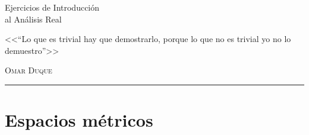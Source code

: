\documentclass[12pt,a4paper]{report}
\begin{document}
\begin{titlepage}
\vspace*{2cm}

\noindent
\vspace*{0.5cm}
\titlefont Ejercicios de Introducción\\ al Análisis Real \par
\vspace{1.5cm}
\epigraph{<<``Lo que es trivial hay que demostrarlo, porque lo que no es trivial yo no lo demuestro''>>}%
{ \textsc{Omar Duque}}
\null\vfill
\vspace*{1cm}
\noindent
\hfill
\begin{minipage}{0.45\linewidth}
    \begin{flushright}
        \printauthor
    \end{flushright}
\end{minipage}
%
\begin{minipage}{0.02\linewidth}
    \rule{1pt}{120pt}
\end{minipage}
\titlepagedecoration
\end{titlepage}


\tableofcontents
\cleardoublepage


\chapter{Espacios métricos}

\end{document}
